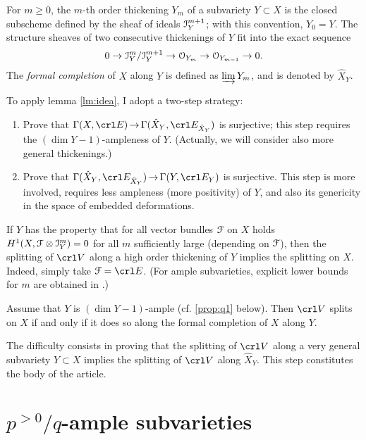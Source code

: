 \documentclass[11pt,reqno]{amsart}
\let\euf\EuScript
\numberwithin{equation}{section}
\numberwithin{figure}{section}
\let\ges\geqslant
\begin{document}
\begin{m-definition}\label{def:thick}
For $m\ges 0$, the $m$-th order thickening $Y_m$ of a subvariety $Y\subset X$ is the 
closed subscheme defined by the sheaf of ideals ${{\euf I}}_Y^{m+1}$; with this convention, 
$Y_0=Y$. The structure sheaves of two consecutive thickenings of $Y$ fit into the exact 
sequence 
\begin{equation}\label{eq:Ym}
0\to{{\euf I}}_Y^m/{{\euf I}}_Y^{m+1}\to{{\euf O}}_{Y_{m}}\to{{\euf O}}_{Y_{m-1}}\to 0.
\end{equation}
The \emph{formal completion} of $X$ along $Y$ is defined as $\varinjlim Y_m$, 
and is denoted by $\hat X_Y$. 
\end{m-definition}
To apply lemma \ref{lm:idea}, I adopt a two-step strategy:  
\begin{enumerate}\label{strategy}
\item Prove that $\Gamma(X,\crl E)\,{\to}\,\Gamma(\hat X_Y,\crl E_{\hat X_Y})$ 
is surjective; this step requires the $(\dim Y-1)$-ampleness of $Y$. 
(Actually, we will consider also more general thickenings.)

\item Prove that  $\Gamma(\hat X_Y,\crl E_{\hat X_Y})\,{\to}\,\Gamma(Y,\crl E_Y)$ 
is surjective. This step is more involved, requires less ampleness (more positivity) of $Y$, 
and also its genericity in the space of embedded deformations.
\end{enumerate}
If $Y$ has the property that for all vector bundles ${{\euf F}}$ on $X$ holds 
$H^1(X,{{\euf F}}\otimes{{\euf I}}_Y^m)=0$  for all $m$ sufficiently large (depending on ${{\euf F}}$), 
then the splitting of $\crl V$ along a high order thickening of $Y$ implies 
the splitting on $X$. Indeed, simply take ${{\euf F}}=\crl E$. 
(For ample subvarieties, explicit lower bounds for $m$ are obtained in \cite{hal}.) 

\begin{m-lemma}\label{lm:y-1}
Assume that $Y$ is $(\dim Y-1)$-ample (cf. \ref{prop:q1} below). Then $\crl V$ splits 
on $X$ if and only if it does so along the formal completion of $X$ along $Y$. 
\end{m-lemma}

The difficulty consists in proving that the splitting of $\crl V$ along a very general 
subvariety $Y\subset X$ implies the splitting of $\crl V$ along $\hat X_Y$.  
This step constitutes the body of the article.

\section{$p^{{>0}}/q$-ample subvarieties}\label{sct:q-tech}
\end{document}
